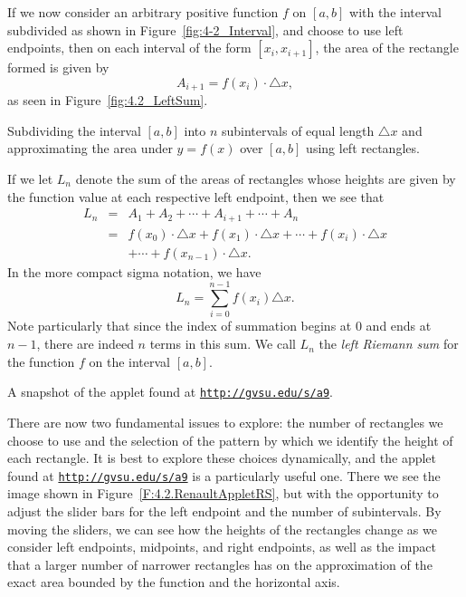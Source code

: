 If we now consider an arbitrary positive function $f$ on $[a,b]$ with the interval subdivided as shown in Figure~\ref{fig:4-2_Interval}, and choose to use left endpoints, then on each interval of the form $[x_{i}, x_{i+1}]$, the area of the rectangle formed is given by
\[ A_{i+1} = f(x_i) \cdot \triangle x,\]
as seen in Figure~\ref{fig:4.2_LeftSum}.

\begin{marginfigure} %
\caption{Subdividing the interval $[a,b]$ into $n$ subintervals of equal length $\triangle x$ and approximating the area under $y = f(x)$ over $[a,b]$ using left rectangles.} \label{fig:4.2_LeftSum}
\end{marginfigure}

If we let $L_n$ denote the sum of the areas of rectangles whose heights are given by the function value at each respective left endpoint, then we see that
\begin{eqnarray*}
L_n & = & A_1 + A_2 + \cdots + A_{i+1} + \cdots + A_n \\
	& = & f(x_0) \cdot \triangle x + f(x_1) \cdot \triangle x + \cdots + f(x_i) \cdot \triangle x \\ 
& & + \cdots + f(x_{n-1}) \cdot \triangle x.
\end{eqnarray*}
In the more compact sigma notation, we have 
\[ L_n = \sum_{i = 0}^{n-1} f(x_i) \triangle x. \]
Note particularly that since the index of summation begins at $0$ and ends at $n-1$, there are indeed $n$ terms in this sum.  We call $L_n$ the \emph{left Riemann sum}   for the function $f$ on the interval $[a,b]$.

\begin{marginfigure}[3in] %
\caption{A snapshot of the applet found at \href{http://gvsu.edu/s/a9}{\texttt{http://gvsu.edu/s/a9}}.} \label{F:4.2.RenaultAppletRS}
\end{marginfigure}

There are now two fundamental issues to explore:  the number of rectangles we choose to use and the selection of the pattern by which we identify the height of each rectangle.  It is best to explore these choices dynamically, and the applet found at \href{http://gvsu.edu/s/a9}{\texttt{http://gvsu.edu/s/a9}} is a particularly useful one.  There we see the image shown in Figure~\ref{F:4.2.RenaultAppletRS}, but with the opportunity to adjust the slider bars for the left endpoint and the number of subintervals.  By moving the sliders, we can see how the heights of the rectangles change as we consider left endpoints, midpoints, and right endpoints, as well as the impact that a larger number of narrower rectangles has on the approximation of the exact area bounded by the function and the horizontal axis.  

